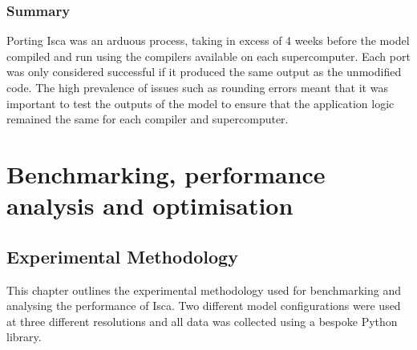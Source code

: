 \documentclass[a4paper,11pt]{report}
\begin{document}
\section{Summary}
Porting Isca was an arduous process, taking in excess of 4 weeks before the model compiled and run using the compilers available on each supercomputer. Each port was only considered successful if it produced the same output as the unmodified code. The high prevalence of issues such as rounding errors meant that it was important to test the outputs of the model to ensure that the application logic remained the same for each compiler and supercomputer.




\part{Benchmarking, performance analysis and optimisation}
\chapter{Experimental Methodology}
This chapter outlines the experimental methodology used for benchmarking and analysing the performance of Isca. Two different model configurations were used at three different resolutions and all data was collected using a bespoke Python library.
%
%	
%	
%	
%	
%	
%	
\end{document}
